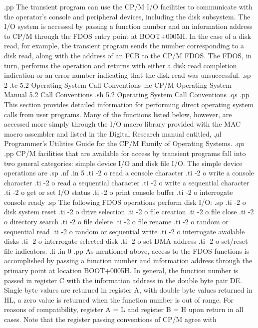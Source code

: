 .pp
The transient program can use the CP/M I/O facilities to communicate with the 
operator's console and peripheral devices, including the disk subsystem.  The 
I/O system is accessed by passing a function number and an information address 
to CP/M through the FDOS entry point at BOOT+0005H.  In the case of a disk 
read, for example, the transient program sends the number corresponding to a 
disk read, along with the address of an FCB to the CP/M FDOS.  The FDOS, in 
turn, performs the operation and returns with either a disk read completion 
indication or an error number indicating that the disk read was unsuccessful.
.sp 2
.tc    5.2  Operating System Call Conventions
.he CP/M Operating System Manual                5.2  Call Conventions
.sh
5.2  Operating System Call Conventions
.qs
.pp
This section provides detailed information for performing direct operating 
system calls from user programs.  Many of the functions listed below, however, 
are accessed more simply through the I/O macro library provided with the 
MAC macro assembler and listed in the Digital Research manual 
entitled, \c
.ul
Programmer's Utilities Guide for the CP/M Family of Operating Systems.
.qu
.pp
CP/M facilities that are available for access by transient programs fall into 
two general categories:  simple device I/O and disk file I/O.  The simple 
device operations are
.sp 
.nf
.in 5
.ti -2
o read a console character
.ti -2
o write a console character
.ti -2
o read a sequential character
.ti -2
o write a sequential character
.ti -2
o get or set I/O status
.ti -2
o print console buffer
.ti -2
o interrogate console ready
.sp
The following FDOS operations perform disk I/O:
.sp 
.ti -2
o disk system reset
.ti -2
o drive selection
.ti -2
o file creation
.ti -2
o file close
.ti -2
o directory search
.ti -2
o file delete
.ti -2
o file rename
.ti -2
o random or sequential read
.ti -2
o random or sequential write
.ti -2
o interrogate available disks
.ti -2
o interrogate selected disk
.ti -2
o set DMA address
.ti -2
o set/reset file indicators.
.fi
.in 0
.pp
As mentioned above, access to the FDOS functions is accomplished by passing 
a function number and information address through the primary point at 
location BOOT+0005H.  In general, the function number is passed in register C 
with the information address in the double byte pair DE.  Single byte values 
are returned in register A, with double byte values returned in HL, a zero 
value is returned when the function number is out of range.  For reasons of 
compatibility, register A = L and register B = H upon return in all cases.  
Note that the register passing conventions of CP/M agree with 
